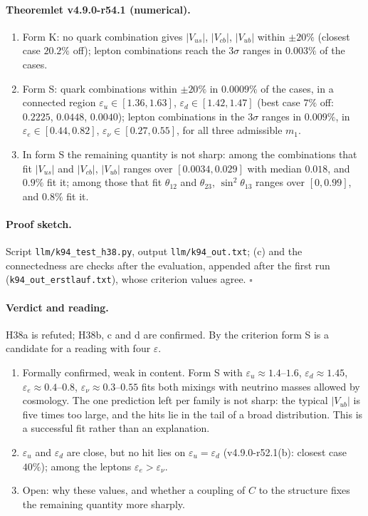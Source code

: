 \paragraph{Theoremlet v4.9.0-r54.1 (numerical).}
\begin{enumerate}[leftmargin=2em]
\item[(a)] Form K: no quark combination gives \(|V_{us}|\), \(|V_{cb}|\), \(|V_{ub}|\) within \(\pm20\%\) (closest case \(20.2\%\) off); lepton combinations
reach the \(3\sigma\) ranges in \(0.003\%\) of the cases.
\item[(b)] Form S: quark combinations within \(\pm20\%\) in \(0.0009\%\) of the cases, in a connected region \(\varepsilon_u\in[1.36,1.63]\),
\(\varepsilon_d\in[1.42,1.47]\) (best case \(7\%\) off: \(0.2225\), \(0.0448\), \(0.0040\)); lepton combinations in the \(3\sigma\) ranges in \(0.009\%\),
in \(\varepsilon_e\in[0.44,0.82]\), \(\varepsilon_\nu\in[0.27,0.55]\), for all three admissible \(m_1\).
\item[(c)] In form S the remaining quantity is not sharp: among the combinations that fit \(|V_{us}|\) and \(|V_{cb}|\), \(|V_{ub}|\) ranges over
\([0.0034,0.029]\) with median \(0.018\), and \(0.9\%\) fit it; among those that fit \(\theta_{12}\) and \(\theta_{23}\), \(\sin^2\theta_{13}\) ranges over
\([0,0.99]\), and \(0.8\%\) fit it.
\end{enumerate}

\paragraph{Proof sketch.}
Script \texttt{llm/k94\_test\_h38.py}, output \texttt{llm/k94\_out.txt}; (c) and the connectedness are checks after the evaluation, appended after the
first run (\texttt{k94\_out\_erstlauf.txt}), whose criterion values agree.  \(\square\)

\paragraph{Verdict and reading.}
H38a is refuted; H38b, c and d are confirmed.  By the criterion form S is a candidate for a reading with four \(\varepsilon\).
\begin{enumerate}[leftmargin=2em]
\item Formally confirmed, weak in content.  Form S with \(\varepsilon_u\approx1.4\)--\(1.6\), \(\varepsilon_d\approx1.45\), \(\varepsilon_e\approx0.4\)--\(0.8\),
\(\varepsilon_\nu\approx0.3\)--\(0.55\) fits both mixings with neutrino masses allowed by cosmology.  The one prediction left per family is not sharp: the
typical \(|V_{ub}|\) is five times too large, and the hits lie in the tail of a broad distribution.  This is a successful fit rather than an
explanation.
\item \(\varepsilon_u\) and \(\varepsilon_d\) are close, but no hit lies on \(\varepsilon_u=\varepsilon_d\) (v4.9.0-r52.1(b): closest case \(40\%\)); among
the leptons \(\varepsilon_e>\varepsilon_\nu\).
\item Open: why these values, and whether a coupling of \(C\) to the structure fixes the remaining quantity more sharply.
\end{enumerate}

